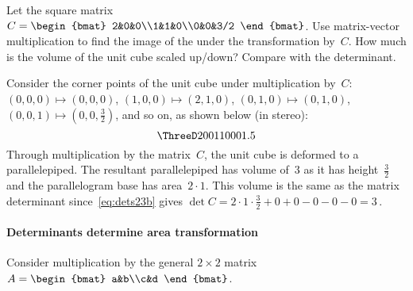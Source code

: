 \begin{example} \label{eg:detarea3}
Let the square matrix \(C=\begin{bmat} 2&0&0\\1&1&0\\0&0&3/2 \end{bmat}\).
Use matrix-vector multiplication to find the image of the  under the transformation by~\(C\).
How much is the volume of the unit cube scaled up/down?  
Compare with the determinant.
\begin{solution} 
Consider the corner points of the unit cube under multiplication by~\(C\): \((0,0,0)\mapsto(0,0,0)\)\index{$\mapsto$}, \((1,0,0)\mapsto(2,1,0)\), \((0,1,0)\mapsto(0,1,0)\),  \((0,0,1)\mapsto(0,0,\frac32)\), and so on, as shown below (in stereo):
\begin{equation*}
\def\unithousesize{small}
\ThreeD20011000{1.5}
\end{equation*}
Through multiplication by the matrix~\(C\), the unit cube is deformed to a parallelepiped.
The resultant parallelepiped has volume of~\(3\) as it has height~\(\frac32\) and the parallelogram base has area~\(2\cdot1\).
This volume is the same  as the matrix determinant since~\eqref{eq:dets23b} gives \(\det C=2\cdot1\cdot\frac32+0+0-0-0-0=3\)\,.
\end{solution}
\end{example}






\paragraph{Determinants determine area transformation}
Consider multiplication by the general \(2\times2\) matrix \(A=\begin{bmat} a&b\\c&d \end{bmat}\).

